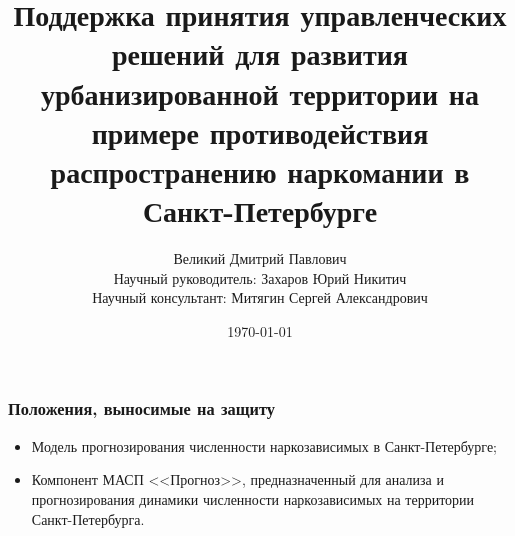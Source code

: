\documentclass[t]{beamer}  %
\title{Поддержка принятия управленческих решений для развития урбанизированной
    территории на примере противодействия распространению наркомании в
    Санкт-Петербурге}
\author{Великий Дмитрий Павлович \\ Научный руководитель: Захаров Юрий Никитич
    \\ Научный консультант: Митягин Сергей Александрович}
\date{\today}
\institute[ИТМО]{Университет ИТМО \\ Кафедра управления государственными
    информационными системами}
\begin{document}
\frame[plain]{\titlepage}	%

\begin{frame}
    \frametitle{Положения, выносимые на защиту}%
	\begin{itemize}
        \item \alert{Модель} прогнозирования численности наркозависимых в
            Санкт-Петербурге;
        \item \alert{Компонент} МАСП <<Прогноз>>, предназначенный для анализа и
            прогнозирования динамики численности наркозависимых на территории
            Санкт-Петербурга.
	\end{itemize}
\end{frame}
\end{document}
